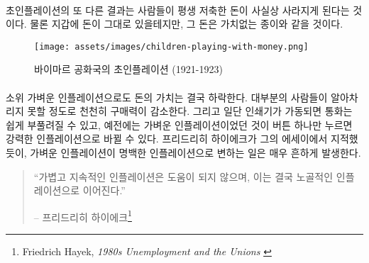 \paragraph{}
초인플레이션의 또 다른 결과는 사람들이 평생 저축한 돈이 사실상 사라지게 된다는 것이다. 
물론 지갑에 돈이 그대로 있을테지만, 그 돈은 가치없는 종이와 같을 것이다.

\begin{figure}
	\texttt{[image: assets/images/children-playing-with-money.png]}
	\caption{바이마르 공화국의 초인플레이션 (1921-1923)}
	\label{fig:children-playing-with-money}
\end{figure}

\paragraph{}
소위 가벼운 인플레이션으로도 돈의 가치는 결국 하락한다. 
대부분의 사람들이 알아차리지 못할 정도로 천천히 구매력이 감소한다. 
그리고 일단 인쇄기가 가동되면 통화는 쉽게 부풀려질 수 있고, 예전에는 가벼운 인플레이션이었던 것이
버튼 하나만 누르면 강력한 인플레이션으로 바뀔 수 있다.
프리드리히 하이에크가 그의 에세이에서 지적했듯이, 가벼운 인플레이션이 명백한 인플레이션으로 변하는 일은 매우 흔하게 발생한다.

\begin{quotation}\begin{samepage}
		\enquote{가볍고 지속적인 인플레이션은 도움이 되지 않으며, 이는 결국 노골적인 인플레이션으로 이어진다.}
		\begin{flushright} -- 프리드리히 하이에크\footnote{Friedrich Hayek, \textit{1980s
					Unemployment and the Unions} \cite{hayek-inflation}}
\end{flushright}\end{samepage}\end{quotation}

